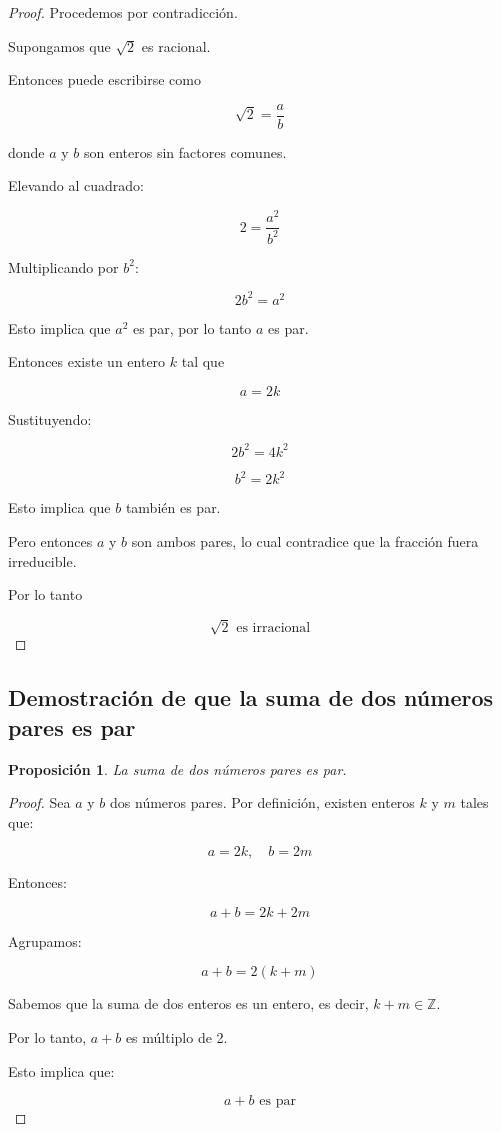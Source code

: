 \documentclass[12pt,final]{report}
\theoremstyle{plain}
\newtheorem{proposition}[theorem]{Proposición}
\theoremstyle{definition}
\begin{document}
\begin{proof}

Procedemos por contradicción.

Supongamos que $\sqrt{2}$ es racional.

Entonces puede escribirse como

\[
\sqrt{2} = \frac{a}{b}
\]

donde $a$ y $b$ son enteros sin factores comunes.

Elevando al cuadrado:

\[
2 = \frac{a^2}{b^2}
\]

Multiplicando por $b^2$:

\[
2b^2 = a^2
\]

Esto implica que $a^2$ es par, por lo tanto $a$ es par.

Entonces existe un entero $k$ tal que

\[
a = 2k
\]

Sustituyendo:

\[
2b^2 = 4k^2
\]

\[
b^2 = 2k^2
\]

Esto implica que $b$ también es par.

Pero entonces $a$ y $b$ son ambos pares, lo cual contradice que la fracción fuera irreducible.

Por lo tanto

\[
\sqrt{2} \text{ es irracional}
\]

\end{proof}

\newpage
\subsection{Demostración de que la suma de dos números pares es par}

\begin{proposition}
La suma de dos números pares es par.
\end{proposition}

\begin{proof}

Sea $a$ y $b$ dos números pares. Por definición, existen enteros $k$ y $m$ tales que:

\[
a = 2k, \quad b = 2m
\]

Entonces:

\[
a + b = 2k + 2m
\]

Agrupamos:

\[
a + b = 2(k + m)
\]

Sabemos que la suma de dos enteros es un entero, es decir, $k + m \in \mathbb{Z}$.

Por lo tanto, $a+b$ es múltiplo de 2.

Esto implica que:

\[
a + b \text{ es par}
\]

\end{proof}
\end{document}
